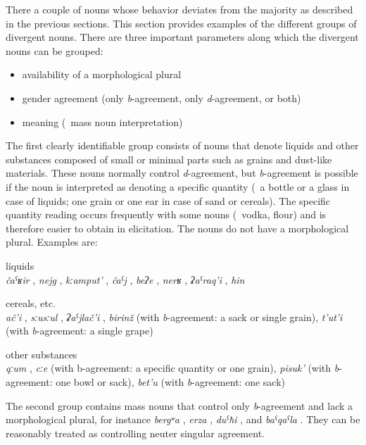 There a couple of nouns whose behavior deviates from the majority as described in the previous sections. This section provides examples of the different groups of divergent nouns. There are three important parameters along which the divergent nouns can be grouped:
%
\begin{itemize}
	\item availability of a morphological plural
	\item gender agreement (only \textit{b}-agreement, only \textit{d}-agreement, or both)
	\item meaning (\teg\ mass noun interpretation)
\end{itemize}
%
The first clearly identifiable group consists of nouns that denote liquids and other substances composed of small or minimal parts such as grains and dust-like materials. These nouns normally control \textit{d}-agreement, but \textit{b}-agreement is possible if the noun is interpreted as denoting a specific quantity (\teg\ a bottle or a glass in case of liquids; one grain or one ear in case of sand or cereals). The specific quantity reading occurs frequently with some nouns (\teg\ vodka, flour) and is therefore easier to obtain in elicitation. The nouns do not have a morphological plural. Examples are:
%
\begin{exe}
	\ex	liquids\\
		\textit{čaˁʁir} , \textit{nejg} , \textit{kːamput'} , \textit{čaˁj} , \textit{beʔe} , \textit{nerʁ} , \textit{ʡaˁraq'i} , \textit{hin} 

	\ex	cereals, etc. \\
		\textit{ač'i} , \textit{sːusːul} , \textit{ʡaˁjlač'i} , \textit{birinž}  (with \textit{b}-agreement: a sack or single grain), \textit{t'ut'i}  (with \textit{b}-agreement: a single grape)
	
	\ex	other substances\\
		\textit{qːum} , \textit{cːe}  (with b-agreement: a specific quantity or one grain), \textit{pisuk'}  (with \textit{b}-agreement: one bowl or sack), \textit{bet'u}  (with \textit{b}-agreement: one sack)
\end{exe}

The second group contains mass nouns that control only \textit{b}-agreement and lack a morphological plural, for instance \textit{bergʷa} , \textit{erza} , \textit{duˁħi} , and \textit{baˁqaˁla} . They can be reasonably treated as controlling neuter singular agreement.

